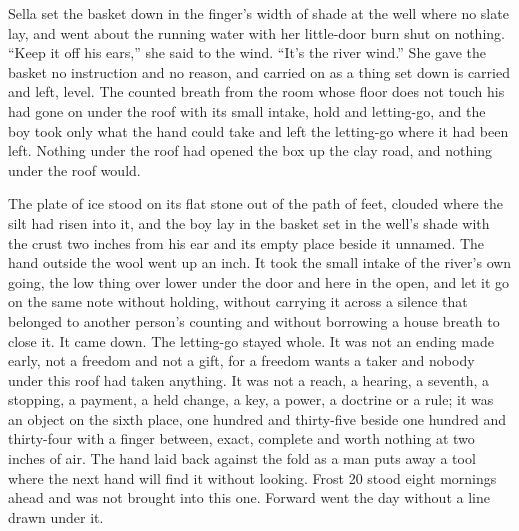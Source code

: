 Sella set the basket down in the finger’s width of shade at the well where no slate lay, and went about the running water with her little-door burn shut on nothing. “Keep it off his ears,” she said to the wind. “It’s the river wind.” She gave the basket no instruction and no reason, and carried on as a thing set down is carried and left, level. The counted breath from the room whose floor does not touch his had gone on under the roof with its small intake, hold and letting-go, and the boy took only what the hand could take and left the letting-go where it had been left. Nothing under the roof had opened the box up the clay road, and nothing under the roof would.

The plate of ice stood on its flat stone out of the path of feet, clouded where the silt had risen into it, and the boy lay in the basket set in the well’s shade with the crust two inches from his ear and its empty place beside it unnamed. The hand outside the wool went up an inch. It took the small intake of the river’s own going, the low thing over lower under the door and here in the open, and let it go on the same note without holding, without carrying it across a silence that belonged to another person’s counting and without borrowing a house breath to close it. It came down. The letting-go stayed whole. It was not an ending made early, not a freedom and not a gift, for a freedom wants a taker and nobody under this roof had taken anything. It was not a reach, a hearing, a seventh, a stopping, a payment, a held change, a key, a power, a doctrine or a rule; it was an object on the sixth place, one hundred and thirty-five beside one hundred and thirty-four with a finger between, exact, complete and worth nothing at two inches of air. The hand laid back against the fold as a man puts away a tool where the next hand will find it without looking. Frost 20 stood eight mornings ahead and was not brought into this one. Forward went the day without a line drawn under it.
